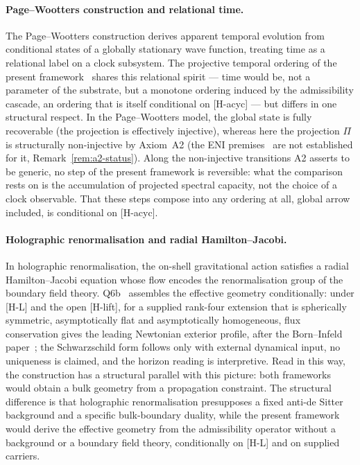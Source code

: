 \documentclass[11pt,a4paper]{article}
\begin{document}
  \paragraph{Page--Wootters construction and relational time.}
    The Page--Wootters construction derives apparent temporal evolution from conditional
    states of a globally stationary wave function, treating time as a relational label on
    a clock subsystem.
    The projective temporal ordering of the present framework~\cite{Beau2026pto} shares
    this relational spirit — time would be, not a parameter of the substrate, but a monotone
    ordering induced by the admissibility cascade, an ordering that is itself conditional on
    \textup{[H-acyc]} — but differs in one structural respect.
    In the Page--Wootters model, the global state is fully recoverable (the projection is
    effectively injective), whereas here the projection $\Pi$ is structurally non-injective
    by Axiom~A2 (the ENI premises~\cite{Beau2026l} are not established for it,
    Remark~\ref{rem:a2-status}).
    Along the non-injective transitions A2 asserts to be generic, no step of the present framework
    is reversible: what the comparison rests on is the accumulation of projected spectral capacity,
    not the choice of a clock observable.
    That these steps compose into any ordering at all, global arrow included, is conditional on
    \textup{[H-acyc]}.

  \paragraph{Holographic renormalisation and radial Hamilton--Jacobi.}
    In holographic renormalisation, the on-shell gravitational action satisfies a radial
    Hamilton--Jacobi equation whose flow encodes the renormalisation group of the boundary
    field theory.
    Q6b~\cite{Beau2026q6b} assembles the effective geometry conditionally: under [H-L] and the open [H-lift],
    for a supplied rank-four extension that is spherically symmetric, asymptotically flat and asymptotically
    homogeneous, flux conservation gives the leading Newtonian exterior profile, after the Born--Infeld
    paper~\cite{Beau2026c}; the Schwarzschild form follows only with external dynamical input, no uniqueness is
    claimed, and the horizon reading is interpretive.
    Read in this way, the construction has a structural parallel with this picture: both frameworks would
    obtain a bulk geometry from a propagation constraint.
    The structural difference is that holographic renormalisation presupposes a fixed
    anti-de Sitter background and a specific bulk-boundary duality, while the present
    framework would derive the effective geometry from the admissibility operator without a background or a
    boundary field theory, conditionally on [H-L] and on supplied carriers.
\end{document}
